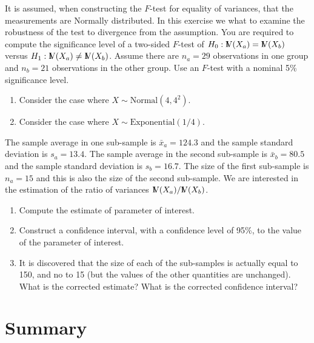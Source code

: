 \documentclass[]{krantz}
\newcommand{\Var}{{\rm I\kern-.3em V}}
\theoremstyle{definition}
\theoremstyle{definition}
\theoremstyle{definition}
\theoremstyle{remark}
\let\BeginKnitrBlock\begin \let\EndKnitrBlock\end
\begin{document}
\BeginKnitrBlock{exercise}
\protect\hypertarget{exr:unnamed-chunk-202}{}{\label{exr:unnamed-chunk-202}
}It is assumed, when constructing the \(F\)-test for equality of
variances, that the measurements are Normally distributed. In this
exercise we what to examine the robustness of the test to divergence
from the assumption. You are required to compute the significance level
of a two-sided \(F\)-test of \(H_0:\Var(X_a)=\Var(X_b)\) versus
\(H_1: \Var(X_a)\not =\Var(X_b)\). Assume there are \(n_a=29\)
observations in one group and \(n_b = 21\) observations in the other
group. Use an \(F\)-test with a nominal 5\% significance level.

\begin{enumerate}
\def\labelenumi{\arabic{enumi}.}
\item
  Consider the case where \(X \sim \mathrm{Normal}(4,4^2)\).
\item
  Consider the case where \(X \sim \mathrm{Exponential}(1/4)\).
\end{enumerate}
\EndKnitrBlock{exercise}

\BeginKnitrBlock{exercise}
\protect\hypertarget{exr:unnamed-chunk-203}{}{\label{exr:unnamed-chunk-203}
}The sample average in one sub-sample is \(\bar x_a = 124.3\) and the
sample standard deviation is \(s_a = 13.4\). The sample average in the
second sub-sample is \(\bar x_b = 80.5\) and the sample standard
deviation is \(s_b = 16.7\). The size of the first sub-sample is
\(n_a=15\) and this is also the size of the second sub-sample. We are
interested in the estimation of the ratio of variances
\(\Var(X_a)/\Var(X_b)\).

\begin{enumerate}
\def\labelenumi{\arabic{enumi}.}
\item
  Compute the estimate of parameter of interest.
\item
  Construct a confidence interval, with a confidence level of 95\%, to
  the value of the parameter of interest.
\item
  It is discovered that the size of each of the sub-samples is actually
  equal to 150, and no to 15 (but the values of the other quantities are
  unchanged). What is the corrected estimate? What is the corrected
  confidence interval?
\end{enumerate}
\EndKnitrBlock{exercise}

\section{Summary}\label{summary-11}
\end{document}
